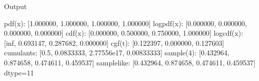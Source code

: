 \documentclass[letterpaper,10pt,english]{sphinxmanual}
\begin{document}
\begin{sphinxVerbatim}[commandchars=\\\{\}]
\end{sphinxVerbatim}

\sphinxAtStartPar
Output

\begin{sphinxVerbatim}[commandchars=\\\{\}]
pdf(x):      [1.000000, 1.000000, 1.000000, 1.000000]
logpdf(x):   [\PYGZhy{}0.000000, \PYGZhy{}0.000000, \PYGZhy{}0.000000, \PYGZhy{}0.000000]
cdf(x):      [0.000000, 0.500000, 0.750000, 1.000000]
logcdf(x):   [\PYGZhy{}inf, \PYGZhy{}0.693147, \PYGZhy{}0.287682, 0.000000]
cgf(t):      [\PYGZhy{}0.122397, 0.000000, 0.127603]
cumulants:   [0.5, 0.0833333, 2.77556e\PYGZhy{}17, \PYGZhy{}0.00833333]
sample(\PYGZob{}4\PYGZcb{}): [0.432964, 0.874658, 0.474611, 0.459537]
sample\PYGZus{}like: [0.432964, 0.874658, 0.474611, 0.459537] dtype=11
\end{sphinxVerbatim}
\end{document}
